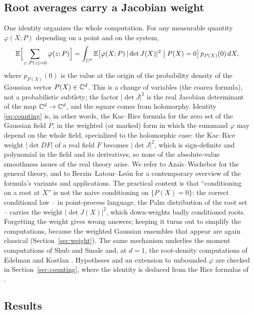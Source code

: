 \subsection{Root averages carry a Jacobian weight}

One identity organizes the whole computation. For any measurable quantity $\varphi(X;P)$
depending on a point and on the system,
\begin{equation}\label{eq:counting}
  \mathbb{E}\Bigl[\sum_{z:\,P(z)=0} \varphi(z;P)\Bigr]
  = \int_{\mathbb{C}^d} \mathbb{E}\bigl[\varphi(X;P)\,|\det J(X)|^2 \bigm| P(X)=0\bigr]\, p_{P(X)}(0)\,dX,
\end{equation}
where $p_{P(X)}(0)$ is the value at the origin of the probability density of the Gaussian
vector $P(X)\in\mathbb{C}^d$. This is a change of variables (the coarea formula), not a probabilistic
subtlety; the factor $|\det J|^2$ is the real Jacobian determinant of the map $\mathbb{C}^d\to\mathbb{C}^d$,
and the square comes from holomorphy. Identity \eqref{eq:counting} is, in other words, the
Kac--Rice formula for the zero set of the Gaussian field $P$, in the weighted (or marked)
form in which the summand $\varphi$ may depend on the whole field, specialized to the
holomorphic case: the Kac--Rice weight $|\det DF|$ of a real field $F$ becomes $|\det J|^2$,
which is sign-definite and polynomial in the field and its derivatives, so none of the
absolute-value smoothness issues of the real theory arise. We refer to
Aza\"is--Wschebor \cite[Ch.~6]{azais2009level} for the general theory, and to
Berzin--Latour--Le\'on \cite{berzin2022kacrice} for a contemporary overview of the formula's
variants and applications. The practical content
is that ``conditioning on a root at $X$'' is not the naive conditioning on $\{P(X)=0\}$: the
correct conditional law -- in point-process language, the Palm distribution of the root set
-- carries the weight $|\det J(X)|^2$, which down-weights badly conditioned roots.
Forgetting the weight gives wrong answers; keeping it turns out to simplify the
computations, because the weighted Gaussian ensembles that appear are again classical
(Section~\ref{sec:weight}). The same mechanism underlies the moment computations of Shub and
Smale \cite{shub1993complexity} and, at $d=1$, the root-density computations of Edelman and
Kostlan \cite{edelman1995howmany}. Hypotheses and an extension to unbounded $\varphi$ are
checked in
Section~\ref{sec:counting}, where the identity is deduced from the Rice formulas of
\cite[Thms.~6.2 and~6.4]{azais2009level}.

\subsection{Results}\label{sec:results}

